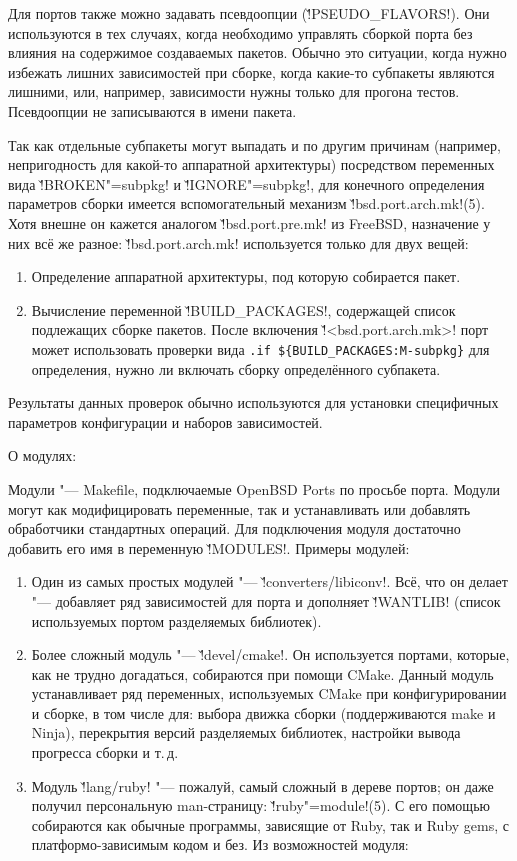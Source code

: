 \documentclass[10pt, a5paper]{article}
\begin{document}
Для портов также можно задавать псевдоопции (\v!PSEUDO\_FLA\-VORS!). Они используются в тех случаях, когда необходимо управлять сборкой порта без влияния на содержимое создаваемых пакетов. Обычно это ситуации, когда нужно избежать лишних зависимостей при сборке, когда какие-то субпакеты являются лишними, или, например, зависимости нужны только для прогона тестов. Псевдоопции не записываются в имени пакета.

Так как отдельные субпакеты могут выпадать и по другим причинам (например, непригодность для какой-то аппаратной архитектуры) посредством переменных вида \v!BROKEN"=subpkg! и \v!IGNORE"=subpkg!, для конечного определения параметров сборки имеется \linebreak вспомогательный механизм \v!bsd.port.arch.mk!(5). Хотя внешне он кажется аналогом \v!bsd.port.pre.mk! из FreeBSD, назначение у них всё же разное: \v!bsd.port.arch.mk! используется только для двух вещей:
\begin{enumerate}
  \item Определение аппаратной архитектуры, под которую собирается пакет.
  \item Вычисление переменной \v!BUILD\_PA\-CKA\-GES!, содержащей список подлежащих сборке пакетов. После включения \linebreak \v!<bsd.port.arch.mk>! порт может использовать проверки вида \linebreak \texttt{.if \$\{BUILD\_PA\-CKA\-GES:M-subpkg\}} для определения, нужно ли включать сборку определённого субпакета.
\end{enumerate}

Результаты данных проверок обычно используются для установки специфичных параметров конфигурации и наборов зависимостей.

О модулях:

Модули "--- Makefile, подключаемые OpenBSD Ports по просьбе порта. Модули могут как модифицировать переменные, так и устанавливать или добавлять обработчики стандартных операций. Для подключения модуля достаточно добавить его имя в переменную \v!MODULES!. Примеры модулей:

\begin{enumerate}
  \item Один из самых простых модулей "--- \v!converters/libiconv!. Всё, что он делает "--- добавляет ряд зависимостей для порта и дополняет \v!WANTLIB! (список используемых портом разделяемых библиотек).
  \item Более сложный модуль "--- \v!devel/cmake!. Он используется портами, которые, как не трудно догадаться, собираются при помощи CMake. Данный модуль устанавливает ряд переменных, используемых CMake при конфигурировании и сборке, в том числе для: выбора движка сборки (поддерживаются make и Ninja), перекрытия версий разделяемых библиотек, настройки вывода прогресса сборки и т.\,д.
  \item Модуль \v!lang/ruby! "--- пожалуй, самый сложный в дереве портов; он даже получил персональную man-страницу: \linebreak\v!ruby"=module!(5). С его помощью собираются как обычные программы, зависящие от Ruby, так и Ruby gems, с платформо-зависимым кодом и без. Из возможностей модуля:
\end{enumerate}
\end{document}
